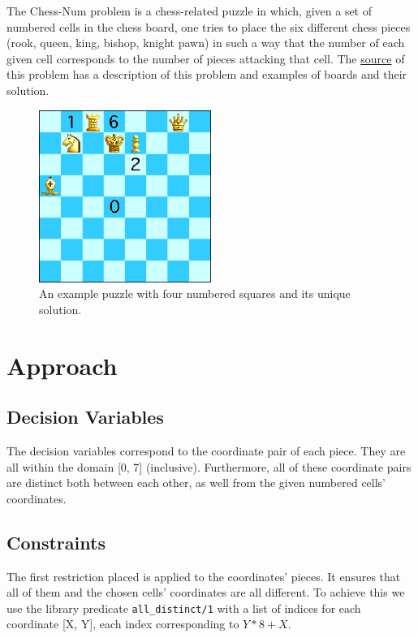 \documentclass[runningheads]{llncs}
\newcommand{\inlinecode}[1]{\texttt{#1}}
\begin{document}
The Chess-Num problem is a chess-related puzzle in which, given a set of
numbered cells in the chess board, one tries to place the six different chess
pieces (rook, queen, king, bishop, knight pawn) in such a way that the number
of each given cell corresponds to the number of pieces attacking that cell.
The \href{https://erich-friedman.github.io/puzzle/chessnum/}{source} of this
problem has a description of this problem and examples of boards and their solution.
\begin{figure}[H]
  \centering
  \includegraphics[width=0.5\textwidth]{figures/chessdemo.eps}
  \caption{An example puzzle with four numbered squares and its unique solution.}\label{fig:fig1}
\end{figure}

\section{Approach}
\subsection{Decision Variables}

The decision variables correspond to the coordinate pair of each piece. They are all
within the domain [0, 7] (inclusive). Furthermore, all of these coordinate pairs are
distinct both between each other, as well from the given numbered cells' coordinates.

\subsection{Constraints}

The first restriction placed is applied to the coordinates' pieces. It ensures that all of them
and the chosen cells' coordinates are all different. To achieve this we use the library
predicate \inlinecode{all\_distinct/1} with a list of indices for each coordinate
[X, Y], each index corresponding to $Y * 8 + X$.
\end{document}
